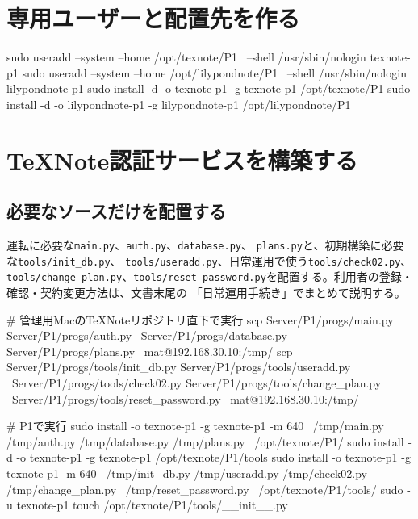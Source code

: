\documentclass[uplatex,a4paper,11pt]{jsarticle}
\begin{document}
\section{専用ユーザーと配置先を作る}

\begin{command}
sudo useradd --system --home /opt/texnote/P1 \
  --shell /usr/sbin/nologin texnote-p1
sudo useradd --system --home /opt/lilypondnote/P1 \
  --shell /usr/sbin/nologin lilypondnote-p1
sudo install -d -o texnote-p1 -g texnote-p1 /opt/texnote/P1
sudo install -d -o lilypondnote-p1 -g lilypondnote-p1 /opt/lilypondnote/P1
\end{command}

\section{TeXNote認証サービスを構築する}

\subsection{必要なソースだけを配置する}

運転に必要な\texttt{main.py}、\texttt{auth.py}、\texttt{database.py}、
\texttt{plans.py}と、初期構築に必要な\texttt{tools/init\_db.py}、
\texttt{tools/useradd.py}、日常運用で使う\texttt{tools/check02.py}、
\texttt{tools/change\_plan.py}、\texttt{tools/reset\_password.py}を配置する。利用者の登録・確認・契約変更方法は、文書末尾の
「日常運用手続き」でまとめて説明する。

\begin{command}
# 管理用MacのTeXNoteリポジトリ直下で実行
scp Server/P1/progs/main.py Server/P1/progs/auth.py \
  Server/P1/progs/database.py Server/P1/progs/plans.py \
  mat@192.168.30.10:/tmp/
scp Server/P1/progs/tools/init_db.py Server/P1/progs/tools/useradd.py \
  Server/P1/progs/tools/check02.py Server/P1/progs/tools/change_plan.py \
  Server/P1/progs/tools/reset_password.py \
  mat@192.168.30.10:/tmp/

# P1で実行
sudo install -o texnote-p1 -g texnote-p1 -m 640 \
  /tmp/main.py /tmp/auth.py /tmp/database.py /tmp/plans.py \
  /opt/texnote/P1/
sudo install -d -o texnote-p1 -g texnote-p1 /opt/texnote/P1/tools
sudo install -o texnote-p1 -g texnote-p1 -m 640 \
  /tmp/init_db.py /tmp/useradd.py /tmp/check02.py /tmp/change_plan.py \
  /tmp/reset_password.py \
  /opt/texnote/P1/tools/
sudo -u texnote-p1 touch /opt/texnote/P1/tools/__init__.py
\end{command}
\end{document}
